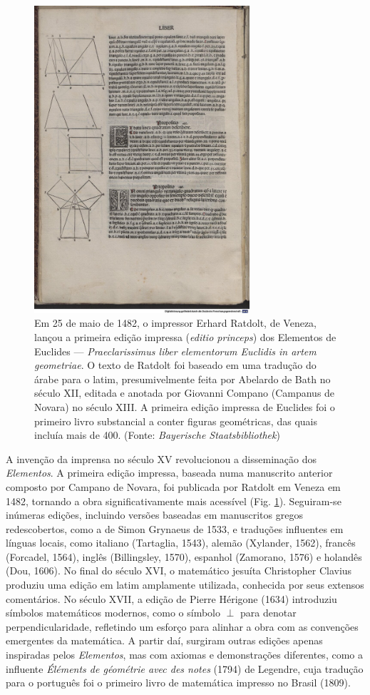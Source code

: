 \documentclass{hipatia}
\begin{document}
\begin{figure}[htb!]
\begin{center}
\includegraphics[width=8cm]{princeps.jpg}
\end{center}
\caption{\label{fig:Princeps}
Em 25 de maio de 1482, o impressor Erhard Ratdolt,
de Veneza, lançou a primeira edição impressa
 (\emph{editio princeps}) dos Elementos de Euclides ---
 \emph{Praeclarissimus liber elementorum Euclidis in artem geometriae}.
  O texto de Ratdolt foi baseado em uma tradução do 
	árabe para o latim, presumivelmente feita por 
	Abelardo de Bath no século XII, editada e anotada 
	por Giovanni Compano (Campanus de Novara) no 
	século XIII. A primeira edição impressa de Euclides 
	foi o primeiro livro substancial a conter figuras 
	geométricas, das quais incluía mais de 400.
(Fonte: \emph{Bayerische Staatsbibliothek})}   
\end{figure}
A invenção da imprensa no século XV revolucionou a
disseminação dos \emph{Elementos}. A primeira edição impressa,
baseada numa manuscrito 
anterior composto por Campano de Novara, 
foi publicada por Ratdolt  em Veneza em 1482, 
tornando a 
obra significativamente mais acessível
(Fig. \ref{fig:Princeps}). Seguiram-se inúmeras
edições, incluindo versões baseadas em manuscritos gregos
redescobertos, como a de Simon Grynaeus de 1533,
e traduções influentes em línguas locais, como italiano
(Tartaglia, 1543), alemão (Xylander, 1562), 
francês (Forcadel, 1564), inglês (Billingsley, 1570),
espanhol (Zamorano, 1576) e holandês (Dou, 1606). No
final do século XVI, o matemático jesuíta Christopher
Clavius produziu uma edição em latim amplamente
utilizada, conhecida por seus extensos comentários.
No século XVII, a edição de Pierre Hérigone (1634)
introduziu símbolos matemáticos modernos, como o
símbolo $\perp$ para denotar perpendicularidade,
refletindo um esforço para
alinhar a obra com as convenções emergentes da matemática.
A partir daí, surgiram outras edições apenas
inspiradas pelos \emph{Elementos}, mas 
com axiomas e demonstrações diferentes,
como a influente
\emph{Éléments de géométrie avec des notes} (1794)
 de Legendre, cuja tradução para o português foi
 o primeiro livro de matemática impresso no Brasil 
 (1809).
\end{document}
